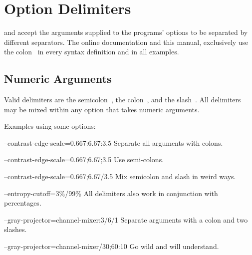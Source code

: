 

\section[Option Delimiters\commonpart]{\label{sec:option-delimiters}%
  Option Delimiters\commonpart}

\App{} and \OtherApp{} accept the arguments supplied to the programs' options to be separated by
different separators.  The online documentation and this manual, exclusively use the
colon~\sample{:} in every syntax definition and in all examples.


\subsection[Numeric Arguments]{\label{sec:option-delimiters-numeric-arguments}%
  Numeric Arguments}

Valid delimiters are the semicolon~\sample{;}, the colon~\sample{:}, and the slash~\sample{/}.
All delimiters may be mixed within any option that takes numeric arguments.

Examples using some  options:

\begin{codelist}
\item[--contrast-edge-scale=0.667:6.67:3.5]\itemend
  Separate all arguments with colons.

\item[--contrast-edge-scale=0.667;6.67;3.5]\itemend
  Use semi-colons.

\item[--contrast-edge-scale=0.667;6.67/3.5]\itemend
  Mix semicolon and slash in weird ways.

\item[--entropy-cutoff=3\%/99\%]\itemend
  All delimiters also work in conjunction with percentages.

\item[--gray-projector=channel-mixer:3/6/1]\itemend
  Separate arguments with a colon and two slashes.

\item[--gray-projector=channel-mixer/30;60:10]\itemend
  Go wild and  will understand.
\end{codelist}


